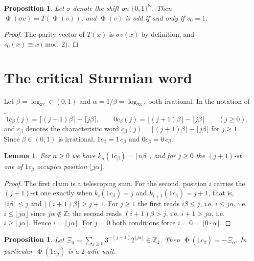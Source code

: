\documentclass[11pt,reqno]{amsart}
\theoremstyle{plain}
\newtheorem{proposition}[theorem]{Proposition}
\newtheorem{lemma}[theorem]{Lemma}
\theoremstyle{definition}
\newcommand{\Zt}{\mathbb{Z}_2}
\newcommand{\Z}{\mathbb{Z}}
\newcommand{\N}{\mathbb{N}}
\DeclareMathOperator{\Ph}{\Phi}
\begin{document}
\begin{proposition}\label{prop:shift}
Let $\sigma$ denote the shift on $\{0,1\}^{\N}$. Then $\Ph(\sigma v)=T(\Ph(v))$,
and $\Ph(v)$ is odd if and only if $v_0=1$.
\end{proposition}

\begin{proof}
The parity vector of $T(x)$ is $\sigma v(x)$ by definition, and $v_0(x)\equiv
x\pmod 2$.
\end{proof}

\section{The critical Sturmian word}\label{sec:word}

Let $\beta=\log_32\in(0,1)$ and $\alpha=1/\beta=\log_23$, both irrational. In the
notation of \cite{LopezStoll2009},
\[
1c_\beta(j)=\lceil (j+1)\beta\rceil-\lceil j\beta\rceil,\qquad
0c_\beta(j)=\lfloor (j+1)\beta\rfloor-\lfloor j\beta\rfloor \qquad (j\ge 0),
\]
and $c_\beta$ denotes the characteristic word $c_\beta(j)=\lfloor
(j+1)\beta\rfloor-\lfloor j\beta\rfloor$ for $j\ge1$. Since $\beta\in(0,1)$ is
irrational, $1c_\beta=1\,c_\beta$ and $0c_\beta=0\,c_\beta$.

\begin{lemma}\label{lem:ones}
For $n\ge 0$ we have $k_n(1c_\beta)=\lceil n\beta\rceil$, and for $j\ge 0$ the
$(j+1)$-st one of $1c_\beta$ occupies position $\lfloor j\alpha\rfloor$.
\end{lemma}

\begin{proof}
The first claim is a telescoping sum. For the second, position $i$ carries the
$(j+1)$-st one exactly when $k_i(1c_\beta)=j$ and $k_{i+1}(1c_\beta)=j+1$, that
is, $\lceil i\beta\rceil\le j$ and $\lceil (i+1)\beta\rceil\ge j+1$. For $j\ge1$
the first reads $i\beta\le j$, i.e. $i\le j\alpha$, i.e. $i\le\lfloor
j\alpha\rfloor$ since $j\alpha\notin\Z$; the second reads $(i+1)\beta>j$, i.e.
$i+1>j\alpha$, i.e. $i\ge\lfloor j\alpha\rfloor$. Hence $i=\lfloor
j\alpha\rfloor$. For $j=0$ both conditions force $i=0=\lfloor 0\cdot\alpha\rfloor$.
\end{proof}

\begin{proposition}\label{prop:xi}
Let $\displaystyle \Xi_\alpha=\sum_{j\ge0}3^{-(j+1)}2^{\lfloor j\alpha\rfloor}\in\Zt$.
Then $\Ph(1c_\beta)=-\Xi_\alpha$. In particular $\Ph(1c_\beta)$ is a $2$-adic
unit.
\end{proposition}
\end{document}
